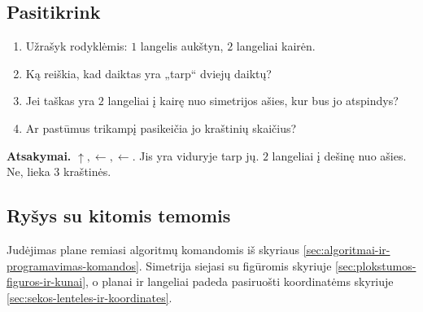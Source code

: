 \subsection{Pasitikrink}

\begin{enumerate}
\item Užrašyk rodyklėmis: \(1\) langelis aukštyn, \(2\) langeliai kairėn.
\item Ką reiškia, kad daiktas yra „tarp“ dviejų daiktų?
\item Jei taškas yra \(2\) langeliai į kairę nuo simetrijos ašies, kur bus jo atspindys?
\item Ar pastūmus trikampį pasikeičia jo kraštinių skaičius?
\end{enumerate}

\textbf{Atsakymai.} \(\uparrow,\leftarrow,\leftarrow\). Jis yra viduryje tarp jų. \(2\) langeliai į dešinę nuo ašies. Ne, lieka \(3\) kraštinės.

\subsection{Ryšys su kitomis temomis}

Judėjimas plane remiasi algoritmų komandomis iš skyriaus \ref{sec:algoritmai-ir-programavimas-komandos}. Simetrija siejasi su figūromis skyriuje \ref{sec:plokstumos-figuros-ir-kunai}, o planai ir langeliai padeda pasiruošti koordinatėms skyriuje \ref{sec:sekos-lenteles-ir-koordinates}.
